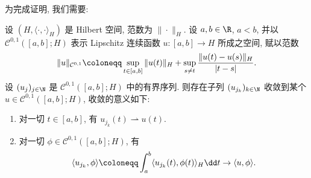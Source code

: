 为完成证明, 我们需要:

\begin{lemma}[弱子列极限]\label{lem:7.2}
设 $(H, \langle \cdot, \cdot \rangle_H)$ 是 Hilbert 空间, 范数为 $\| \cdot \|_H$. 设 $a, b \in \R$, $a < b$, 并以 $\mathcal{C}^{0,1}([a, b]; H)$ 表示 Lipschitz 连续函数 $u \colon [a, b] \to H$ 所成之空间, 赋以范数
\begin{equation}\label{eq:7.12}
    \| u \|_{\mathcal{C}^{0,1}} \defeq \sup_{t \in [a, b]} \| u(t) \|_H + \sup_{s \neq t} \frac{\| u(t) - u(s) \|_H}{| t - s |}.
\end{equation}
设 $(u_j)_{j \in \N}$ 是 $\mathcal{C}^{0,1}([a, b]; H)$ 中的有界序列. 则存在子列 $(u_{j_k})_{k \in \N}$ 收敛到某个 $u \in \mathcal{C}^{0,1}([a, b]; H)$, 收敛的意义如下:
\begin{enumerate}
    \item 对一切 $t \in [a, b]$, 有 $u_{j_k}(t) \rightharpoonup u(t)$.
    \item 对一切 $\phi \in \mathcal{C}^{0,1}([a, b]; H)$, 有
    \begin{equation*}
        \langle u_{j_k}, \phi \rangle \defeq \int_a^b \langle u_{j_k}(t), \phi(t) \rangle_H \dd t \to \langle u, \phi \rangle.
    \end{equation*}
\end{enumerate}
\end{lemma}

